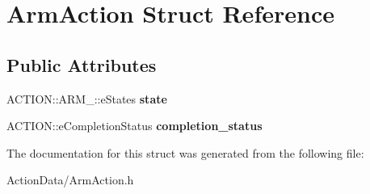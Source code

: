 \hypertarget{struct_arm_action}{
\section{\-Arm\-Action \-Struct \-Reference}
\label{struct_arm_action}
}
\subsection*{\-Public \-Attributes}
\begin{DoxyCompactItemize}
\item 
\hypertarget{struct_arm_action_a8d781ba22061aada82c66639142c413f}{
\-A\-C\-T\-I\-O\-N\-::\-A\-R\-M\-\_\-\-::e\-States {\bfseries state}}
\label{struct_arm_action_a8d781ba22061aada82c66639142c413f}

\item 
\hypertarget{struct_arm_action_ac6c75e56d2ca452524bac5a4dc99a19e}{
\-A\-C\-T\-I\-O\-N\-::e\-Completion\-Status {\bfseries completion\-\_\-status}}
\label{struct_arm_action_ac6c75e56d2ca452524bac5a4dc99a19e}

\end{DoxyCompactItemize}


\-The documentation for this struct was generated from the following file\-:\begin{DoxyCompactItemize}
\item 
\-Action\-Data/\-Arm\-Action.\-h\end{DoxyCompactItemize}
